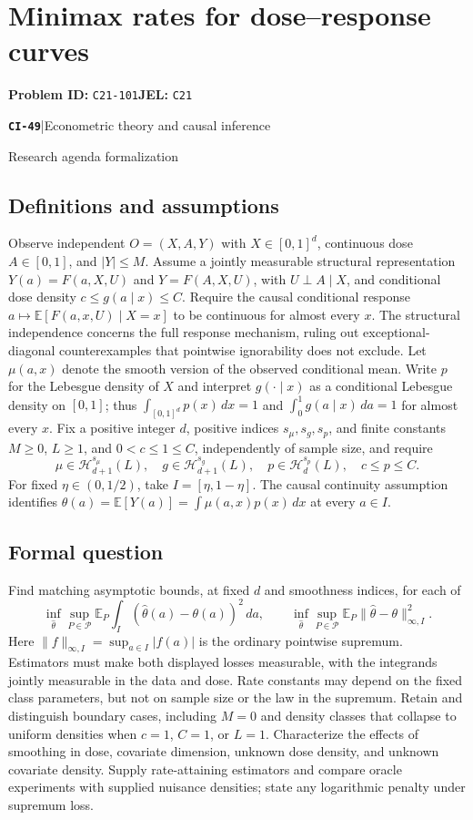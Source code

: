 \documentclass[11pt,a4paper]{article}
\newcommand{\E}{\mathbb E}
\newcommand{\entrymeta}[3]{{\sffamily\small\color{muted}\textbf{\texttt{#1}}\quad|\quad #2\par #3\par}}
\begin{document}
\section*{Minimax rates for dose--response curves}
\textbf{Problem ID:} \texttt{C21-101}\quad \textbf{JEL:} \texttt{C21}\par
\label{problem:OP-0528}
\label{beyond:CI-49}
\entrymeta{CI-49}{Econometric theory and causal inference}{Research agenda formalization}
\subsection*{Definitions and assumptions}
Observe independent $O=(X,A,Y)$ with $X\in[0,1]^d$, continuous dose $A\in[0,1]$, and $|Y|\leq M$. Assume a jointly measurable structural representation $Y(a)=F(a,X,U)$ and $Y=F(A,X,U)$, with $U\perp A\mid X$, and conditional dose density $c\leq g(a\mid x)\leq C$. Require the causal conditional response $a\mapsto\E[F(a,x,U)\mid X=x]$ to be continuous for almost every $x$. The structural independence concerns the full response mechanism, ruling out exceptional-diagonal counterexamples that pointwise ignorability does not exclude. Let $\mu(a,x)$ denote the smooth version of the observed conditional mean. Write $p$ for the Lebesgue density of $X$ and interpret $g(\cdot\mid x)$ as a conditional Lebesgue density on $[0,1]$; thus $\int_{[0,1]^d}p(x)\,dx=1$ and $\int_0^1g(a\mid x)\,da=1$ for almost every $x$. Fix a positive integer $d$, positive indices $s_\mu,s_g,s_p$, and finite constants $M\geq0$, $L\geq1$, and $0<c\leq1\leq C$, independently of sample size, and require
\[
 \mu\in\mathcal H_{d+1}^{s_\mu}(L),\quad
 g\in\mathcal H_{d+1}^{s_g}(L),\quad
 p\in\mathcal H_d^{s_p}(L),\quad c\leq p\leq C.
\]
For fixed $\eta\in(0,1/2)$, take $I=[\eta,1-\eta]$. The causal continuity assumption identifies $\theta(a)=\E[Y(a)]=\int\mu(a,x)p(x)\,dx$ at every $a\in I$.
\subsection*{Formal question}
Find matching asymptotic bounds, at fixed $d$ and smoothness indices, for each of
\[
 \inf_{\widehat\theta}\sup_{P\in\mathcal P}
 \E_P\int_I(\widehat\theta(a)-\theta(a))^2\,da,
 \qquad
 \inf_{\widehat\theta}\sup_{P\in\mathcal P}
 \E_P\|\widehat\theta-\theta\|_{\infty,I}^2.
\]
Here $\|f\|_{\infty,I}=\sup_{a\in I}|f(a)|$ is the ordinary pointwise supremum. Estimators must make both displayed losses measurable, with the integrands jointly measurable in the data and dose. Rate constants may depend on the fixed class parameters, but not on sample size or the law in the supremum. Retain and distinguish boundary cases, including $M=0$ and density classes that collapse to uniform densities when $c=1$, $C=1$, or $L=1$.
Characterize the effects of smoothing in dose, covariate dimension, unknown dose density, and unknown covariate density. Supply rate-attaining estimators and compare oracle experiments with supplied nuisance densities; state any logarithmic penalty under supremum loss.
\end{document}
